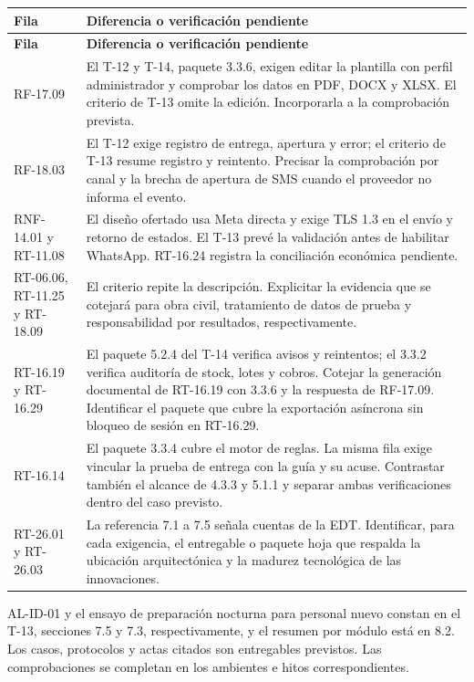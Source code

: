 \documentclass[11pt,letterpaper]{article}
\begin{document}
\begin{longtable}{@{}P{0.21\textwidth}P{\tabcolsep\relax}@{}}
\hline
\textbf{Fila} & \textbf{Diferencia o verificación pendiente} \\
\hline
\endfirsthead
\hline
\textbf{Fila} & \textbf{Diferencia o verificación pendiente} \\
\hline
\endhead
\hline
\endfoot
RF-17.09 & El T-12 y T-14, paquete 3.3.6, exigen editar la plantilla con perfil administrador y comprobar los datos en PDF, DOCX y XLSX. El criterio de T-13 omite la edición. Incorporarla a la comprobación prevista. \\
RF-18.03 & El T-12 exige registro de entrega, apertura y error; el criterio de T-13 resume registro y reintento. Precisar la comprobación por canal y la brecha de apertura de SMS cuando el proveedor no informa el evento. \\
RNF-14.01 y RT-11.08 & El diseño ofertado usa Meta directa y exige TLS 1.3 en el envío y retorno de estados. El T-13 prevé la validación antes de habilitar WhatsApp. RT-16.24 registra la conciliación económica pendiente. \\
RT-06.06, RT-11.25 y RT-18.09 & El criterio repite la descripción. Explicitar la evidencia que se cotejará para obra civil, tratamiento de datos de prueba y responsabilidad por resultados, respectivamente. \\
RT-16.19 y RT-16.29 & El paquete 5.2.4 del T-14 verifica avisos y reintentos; el 3.3.2 verifica auditoría de stock, lotes y cobros. Cotejar la generación documental de RT-16.19 con 3.3.6 y la respuesta de RF-17.09. Identificar el paquete que cubre la exportación asíncrona sin bloqueo de sesión en RT-16.29. \\
RT-16.14 & El paquete 3.3.4 cubre el motor de reglas. La misma fila exige vincular la prueba de entrega con la guía y su acuse. Contrastar también el alcance de 4.3.3 y 5.1.1 y separar ambas verificaciones dentro del caso previsto. \\
RT-26.01 y RT-26.03 & La referencia 7.1 a 7.5 señala cuentas de la EDT. Identificar, para cada exigencia, el entregable o paquete hoja que respalda la ubicación arquitectónica y la madurez tecnológica de las innovaciones. \\
\end{longtable}

AL-ID-01 y el ensayo de preparación nocturna para personal nuevo constan en el T-13, secciones 7.5 y 7.3, respectivamente, y el resumen por módulo está en 8.2. Los casos, protocolos y actas citados son entregables previstos. Las comprobaciones se completan en los ambientes e hitos correspondientes.
\end{document}
